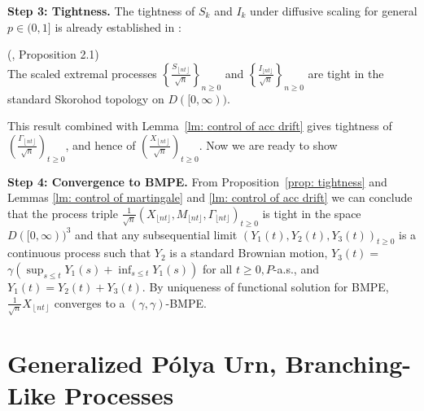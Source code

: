 \documentclass[EJP]{ejpecp} %
\begin{document}
\vspace{1em}

\textbf{Step 3: Tightness.} The tightness of $S_k$ and $I_k$ under diffusive scaling for general $p \in (0,1]$ is already established in \cite{KMP23}:
\begin{proposition}
	(\cite{KMP23}, Proposition 2.1)\\
	\label{prop: tightness}
	The scaled extremal processes $\left\{\frac{S_{\left\lfloor n t \right\rfloor}}{\sqrt{n}}\right\}_{n \geq 0}$ and $\left\{\frac{I_{\lfloor n t \rfloor}}{\sqrt{n}}\right\}_{n \geq 0}$ are tight in the standard Skorohod topology on $D([0, \infty))$.
\end{proposition}
This result combined with Lemma~\ref{lm: control of acc drift} gives tightness of $\left(\frac{\Gamma_{\left\lfloor nt  \right\rfloor}}{\sqrt{n} }\right)_{t \ge 0}$, and hence of $\left(\frac{X_{\left\lfloor nt  \right\rfloor}}{\sqrt{n} }\right)_{t \ge 0}$. 
Now we are ready to show
\vspace{1em}

\textbf{Step 4: Convergence to BMPE.} 
From Proposition~\ref{prop: tightness} and Lemmas \ref{lm: control of martingale} and \ref{lm: control of acc drift} we can conclude that the process triple $\frac{1}{\sqrt{n}}\left(X_{\lfloor n t\rfloor}, M_{\lfloor n t\rfloor}, \Gamma_{\lfloor n t\rfloor}\right)_{t \geq 0}$ is tight in the space $D([0, \infty))^3$ and that any subsequential limit $\left(Y_1(t), Y_2(t), Y_3(t)\right)_{t \geq 0}$ is a continuous process such that $Y_2$ is a standard Brownian motion, $Y_3(t)=$ $\gamma\left(\sup _{s \leq t} Y_1(s)+\inf _{s \leq t} Y_1(s)\right)$ for all $t \geq 0, P$-a.s., and $Y_1(t)=Y_2(t)+Y_3(t)$. By uniqueness of functional solution for BMPE, $\frac{1}{\sqrt{n} } X_{\left\lfloor nt  \right\rfloor}$ converges to a $(\gamma, \gamma)$-BMPE.

\section{Generalized P\'{o}lya Urn, Branching-Like Processes}\label{sec: generalized Polya Urn, BLP}
\end{document}
